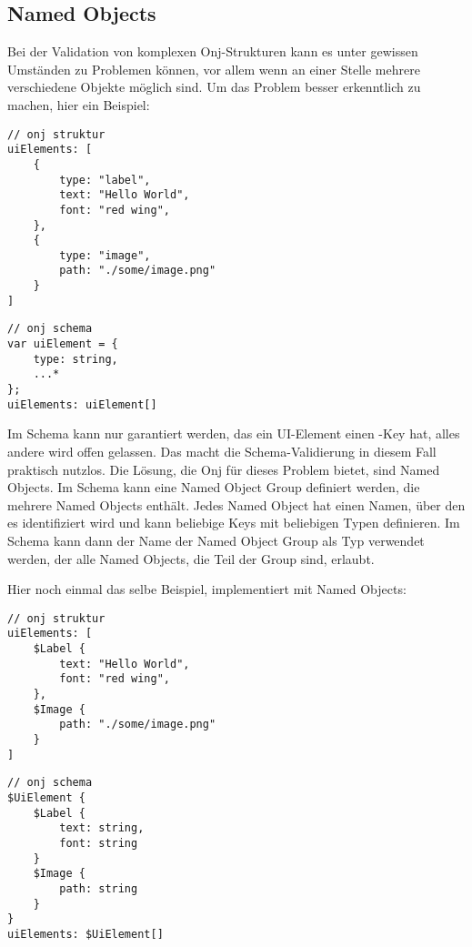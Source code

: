 
\subsection{Named Objects}\label{subsec:named-objects}

\renewcommand{\kapitelautor}{Autor: Marvin Kurka}

Bei der Validation von komplexen Onj-Strukturen kann es unter gewissen Umständen zu Problemen können, vor allem wenn
an einer Stelle mehrere verschiedene Objekte möglich sind.
Um das Problem besser erkenntlich zu machen, hier ein Beispiel:

\begin{verbatim}
// onj struktur
uiElements: [
    {
        type: "label",
        text: "Hello World",
        font: "red wing",
    },
    {
        type: "image",
        path: "./some/image.png"
    }
]
\end{verbatim}

\begin{verbatim}
// onj schema
var uiElement = {
    type: string,
    ...*
};
uiElements: uiElement[]
\end{verbatim}

Im Schema kann nur garantiert werden, das ein UI-Element einen -Key hat, alles andere wird offen
gelassen.
Das macht die Schema-Validierung in diesem Fall praktisch nutzlos.
Die Lösung, die Onj für dieses Problem bietet, sind Named Objects.
Im Schema kann eine Named Object Group definiert werden, die mehrere Named Objects enthält.
Jedes Named Object hat einen Namen, über den es identifiziert wird und kann beliebige Keys mit beliebigen Typen
definieren.
Im Schema kann dann der Name der Named Object Group als Typ verwendet werden, der alle Named Objects, die Teil der Group
sind, erlaubt.

Hier noch einmal das selbe Beispiel, implementiert mit Named Objects:

\begin{verbatim}
// onj struktur
uiElements: [
    $Label {
        text: "Hello World",
        font: "red wing",
    },
    $Image {
        path: "./some/image.png"
    }
]
\end{verbatim}

\begin{verbatim}
// onj schema
$UiElement {
    $Label {
        text: string,
        font: string
    }
    $Image {
        path: string
    }
}
uiElements: $UiElement[]
\end{verbatim}

\renewcommand{\kapitelautor}{}
